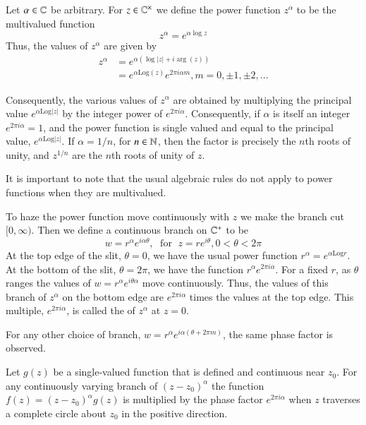 \documentclass[12pt, a4paper, oneside, openright, titlepage]{book}
\begin{document}
\begin{defn}
    Let $\alpha \in \mathbb C$ be arbitrary. For $z \in \mathbb C^{\times}$ we define the power function $z^{\alpha}$ to be the multivalued function \begin{equation*}
        z^{\alpha} = e^{\alpha\log z}
    \end{equation*}
    Thus, the values of $z^{\alpha}$ are given by \begin{align*}
        z^{\alpha} &= e^{\alpha(\log|z| +i\arg(z))} \\
        &= e^{\alpha\text{Log}(z)}e^{2\pi i\alpha m}, m = 0, \pm 1,\pm 2,...
    \end{align*}
\end{defn}

Consequently, the various values of $z^{\alpha}$ are obtained by multiplying the principal value $e^{\alpha\text{Log}|z|}$ by the integer power of $e^{2\pi i\alpha}$. Consequently, if $\alpha$ is itself an integer $e^{2\pi i\alpha} = 1$, and the power function is single valued and equal to the principal value, $e^{\alpha\text{Log}|z|}$. If $\alpha = 1/n$, for $n \in \mathbb N$, then the factor is precisely the $n$th roots of unity, and $z^{1/n}$ are the $n$th roots of unity of $z$.

It is important to note that the usual algebraic rules do not apply to power functions when they are multivalued. 

To haze the power function move continuously with $z$ we make the branch cut $[0,\infty)$. Then we define a continuous branch on $\mathbb C^+$ to be \begin{equation*}
    w = r^{\alpha}e^{i\alpha \theta},\; \text{ for }\;z = re^{i\theta}, 0<\theta < 2\pi
\end{equation*}
At the top edge of the slit, $\theta = 0$, we have the usual power function $r^{\alpha} = e^{\alpha\text{Log}r}$. At the bottom of the slit, $\theta = 2\pi$, we have the function $r^{\alpha}e^{2\pi i\alpha}$. For a fixed $r$, as $\theta$ ranges the values of $w= r^{\alpha}e^{i\theta\alpha}$ move continuously. Thus, the values of this branch of $z^{\alpha}$ on the bottom edge are $e^{2\pi i\alpha}$ times the values at the top edge. This multiple, $e^{2\pi i\alpha}$, is called the  of $z^{\alpha}$ at $z = 0$. 

For any other choice of branch, $w=r^{\alpha}e^{i\alpha(\theta+2\pi m)}$, the same phase factor is observed. 

\begin{lem}\label{lem:phasechange}
    Let $g(z)$ be a single-valued function that is defined and continuous near $z_0$. For any continuously varying branch of $(z-z_0)^{\alpha}$ the function $f(z) = (z-z_0)^{\alpha}g(z)$ is multiplied by the phase factor $e^{2\pi i \alpha}$ when $z$ traverses a complete circle about $z_0$ in the positive direction.
\end{lem}
\end{document}
